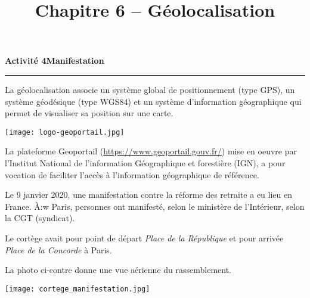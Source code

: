 \documentclass[a4paper]{article}
\begin{document}
\title{Chapitre 6 -- Géolocalisation}

\pagestyle{empty}

\date{}
\author{}

\maketitle{}

\thispagestyle{empty}
\noindent\textbf{Activité 4}\hfill{}\textbf{Manifestation}
\smallskip
\hrule
\medskip

 La géolocalisation associe un système global de positionnement (type GPS), un système géodésique (type WGS84) et un système d'information géographique qui permet de visualiser sa position sur une carte.

 \medskip

 \begin{multicols}{2}
   \begin{center}
     \texttt{[image: logo-geoportail.jpg]}
   \end{center}\columnbreak 

   \vspace*{-1mm}

 La plateforme Geoportail (\url{https://www.geoportail.gouv.fr/}) mise en oeuvre par l'Institut National de l'information Géographique et forestière (IGN), a pour vocation de faciliter l'accès à l'information géographique de référence.
 \end{multicols}

 \begin{multicols}{2}
   \vspace*{-1mm}
   Le 9 janvier 2020, une manifestation contre la réforme des retraite a eu lieu en France. À:w
   Paris,  personnes ont manifesté, selon le ministère de l’Intérieur,  selon la CGT (syndicat).

   \medskip 

   Le cortège avait pour point de départ \textit{Place de la République }et pour arrivée \textit{Place de la Concorde} à Paris. 

   \medskip 

   La photo ci-contre donne une vue aérienne du rassemblement. 
   \vspace*{3cm}
   \begin{center}
     \texttt{[image: cortege\_manifestation.jpg]}
   \end{center}
 \end{multicols}
\end{document}

